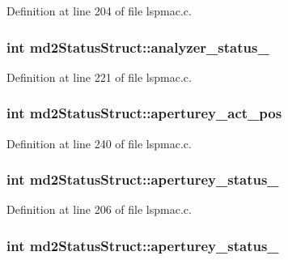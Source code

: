 Definition at line 204 of file lspmac.c.\hypertarget{structmd2StatusStruct_a4f88bb778e4e18f1fbf7672ac11e7433}{
\subsubsection[{analyzer\_\-status\_\-2}]{\setlength{\rightskip}{0pt plus 5cm}int {\bf md2StatusStruct::analyzer\_\-status\_}}}
\label{structmd2StatusStruct_a4f88bb778e4e18f1fbf7672ac11e7433}


Definition at line 221 of file lspmac.c.\hypertarget{structmd2StatusStruct_a2a434d2b57dbb669de0765486a1516ff}{
\subsubsection[{aperturey\_\-act\_\-pos}]{\setlength{\rightskip}{0pt plus 5cm}int {\bf md2StatusStruct::aperturey\_\-act\_\-pos}}}
\label{structmd2StatusStruct_a2a434d2b57dbb669de0765486a1516ff}


Definition at line 240 of file lspmac.c.\hypertarget{structmd2StatusStruct_a2ef953eaddf7058bf4276585e6ff066b}{
\subsubsection[{aperturey\_\-status\_\-1}]{\setlength{\rightskip}{0pt plus 5cm}int {\bf md2StatusStruct::aperturey\_\-status\_}}}
\label{structmd2StatusStruct_a2ef953eaddf7058bf4276585e6ff066b}


Definition at line 206 of file lspmac.c.\hypertarget{structmd2StatusStruct_a0a7738f13a0fa80626cafc2299b104b4}{
\subsubsection[{aperturey\_\-status\_\-2}]{\setlength{\rightskip}{0pt plus 5cm}int {\bf md2StatusStruct::aperturey\_\-status\_}}}
\label{structmd2StatusStruct_a0a7738f13a0fa80626cafc2299b104b4}


